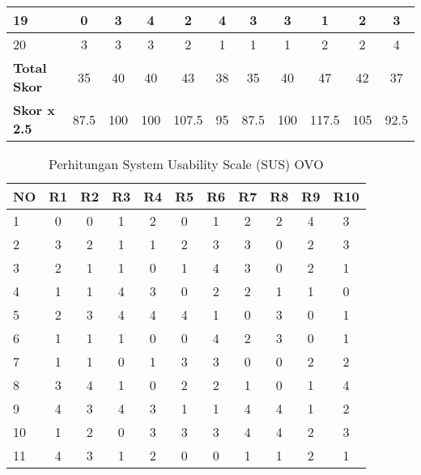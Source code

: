 \begin{table}[hbt!]
\begin{threeparttable}
\begin{tabular}{l*{10}{c}}
            \hline
            19 & 0 & 3 & 4 & 2 & 4 & 3 & 3 & 1 & 2 & 3 \\
            \hline
            20 & 3 & 3 & 3 & 2 & 1 & 1 & 1 & 2 & 2 & 4 \\
            \midrule
            \textbf{Total Skor}   & 35 & 40 & 40 & 43 & 38 & 35 & 40 & 47 & 42 & 37 \\
            \hline
            \textbf{Skor x 2.5}   & 87.5 & 100 & 100 & 107.5 & 95 & 87.5 & 100 & 117.5 & 105 & 92.5 \\
            \bottomrule
        \end{tabular}
    \end{threeparttable}
\end{table}

\begin{table}[hbt!]
    \begin{threeparttable}
        \caption{Perhitungan System Usability Scale (SUS) OVO}
        \label{tabel:sus_ovo}
        \begin{tabular}{l*{10}{c}}
            \toprule
            \textbf{NO} & \textbf{R1} & \textbf{R2} & \textbf{R3} & \textbf{R4} & \textbf{R5} & \textbf{R6} & \textbf{R7} & \textbf{R8} & \textbf{R9} & \textbf{R10} \\
            \midrule
            1  & 0 & 0 & 1 & 2 & 0 & 1 & 2 & 2 & 4 & 3 \\
            \hline
            2  & 3 & 2 & 1 & 1 & 2 & 3 & 3 & 0 & 2 & 3 \\
            \hline
            3  & 2 & 1 & 1 & 0 & 1 & 4 & 3 & 0 & 2 & 1 \\
            \hline
            4  & 1 & 1 & 4 & 3 & 0 & 2 & 2 & 1 & 1 & 0 \\
            \hline
            5  & 2 & 3 & 4 & 4 & 4 & 1 & 0 & 3 & 0 & 1 \\
            \hline
            6  & 1 & 1 & 1 & 0 & 0 & 4 & 2 & 3 & 0 & 1 \\
            \hline
            7  & 1 & 1 & 0 & 1 & 3 & 3 & 0 & 0 & 2 & 2 \\
            \hline
            8  & 3 & 4 & 1 & 0 & 2 & 2 & 1 & 0 & 1 & 4 \\
            \hline
            9  & 4 & 3 & 4 & 3 & 1 & 1 & 4 & 4 & 1 & 2 \\
            \hline
            10 & 1 & 2 & 0 & 3 & 3 & 3 & 4 & 4 & 2 & 3 \\
            \hline
            11 & 4 & 3 & 1 & 2 & 0 & 0 & 1 & 1 & 2 & 1 \\

\end{tabular}
\end{threeparttable}
\end{table}

